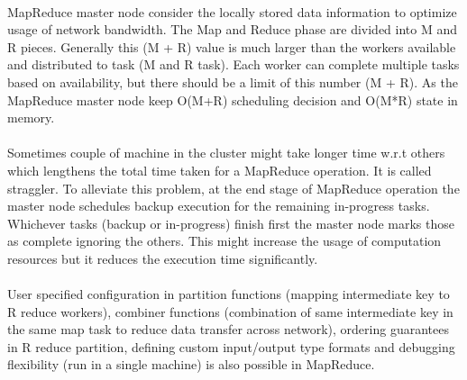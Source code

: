 \documentclass{article}
\begin{document}
\paragraph{}
MapReduce master node consider the locally stored data information to optimize usage of network bandwidth. The Map and Reduce phase are divided into M and R pieces. Generally this (M + R)  value is much larger than the workers available and distributed to task (M and R task). Each worker can complete multiple  tasks based on  availability, but there should be a limit of this number (M + R). As the MapReduce master node keep O(M+R) scheduling decision and O(M*R) state in memory.

\paragraph{}
Sometimes couple of machine in the cluster might take longer time w.r.t others which lengthens the total time taken for a MapReduce operation. It is called straggler. To alleviate this problem, at the end stage of MapReduce operation the master node schedules backup execution for the remaining in-progress tasks. Whichever tasks (backup or in-progress) finish first the master node marks those as complete ignoring the others. This might increase the usage of computation resources but it reduces the execution time significantly.

\paragraph{}
User specified configuration in partition functions (mapping intermediate key to R reduce workers), combiner functions (combination of same intermediate key in the same map task to reduce data transfer across network), ordering guarantees in R reduce partition, defining custom input/output type formats and debugging flexibility (run in a single machine) is also possible in MapReduce.
\end{document}
